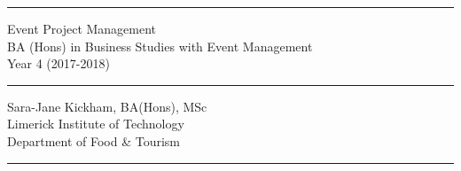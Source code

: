 
\thispagestyle{empty} %


\hrule

\vspace*{0.7cm} %


\begin{flushright}
\Huge Event Project Management \\
\vspace*{0.7cm}
\Large BA (Hons) in Business Studies with Event Management\\
Year 4 (2017-2018)
\end{flushright}

\vspace*{0.7cm} %
	
\normalsize

\hrule


\vfill %


{\centering \large 
\hfill Sara-Jane Kickham, \scriptsize BA(Hons), MSc\normalsize \\
\hfill Limerick Institute of Technology \\
\hfill Department of Food \& Tourism \\
\vspace*{0.7cm} 
\hrule} %


\clearpage %
